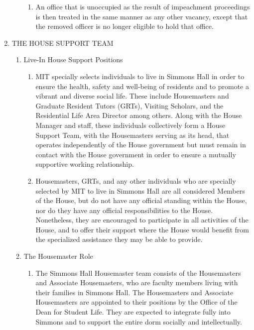 \documentclass[letterpaper]{article}
\begin{document}
\begin{enumerate}
\begin{enumerate}
\begin{enumerate}
\item An office that is unoccupied as the result of impeachment proceedings is then treated in the same manner as any other vacancy, except that the removed officer is no longer eligible to hold that office.

\end{enumerate}

\end{enumerate}

\item THE HOUSE SUPPORT TEAM

\begin{enumerate}

\item Live-In House Support Positions

\begin{enumerate}

\item MIT specially selects individuals to live in Simmons Hall in order to ensure the health, safety and well-being of residents and to promote a vibrant and diverse social life. These include Housemasters and Graduate Resident Tutors (GRTs), Visiting Scholars, and the Residential Life Area Director among others. Along with the House Manager and staff, these individuals collectively form a House Support Team, with the Housemasters serving as its head, that operates independently of
the House government but must remain in contact with the House government in order to ensure a mutually supportive working relationship.

\item Housemasters, GRTs, and any other individuals who are specially selected by MIT to live in Simmons Hall are all considered Members of the House, but do not have any official standing within the House, nor do they have any official responsibilities to the House. Nonetheless, they are encouraged to participate in all activities of the House, and to offer their support where the House would benefit from the specialized assistance they may be able to provide.

\end{enumerate}

\item The Housemaster Role

\begin{enumerate}

\item The Simmons Hall Housemaster team consists of the Housemasters and Associate Housemasters, who are faculty members living with their families in Simmons Hall. The Housemasters and Associate Housemasters are appointed to their positions by the Office of the Dean for Student Life. They are expected to integrate fully into Simmons and to support the entire dorm socially and intellectually.


\end{enumerate}
\end{enumerate}
\end{enumerate}
\end{document}
